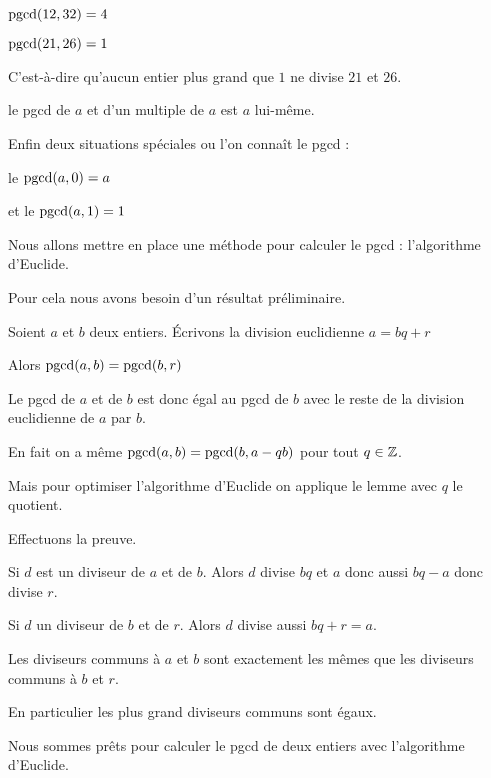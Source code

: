  $\mathop{\mathrm{pgcd}}\nolimits(12,32)=4$ 

\change

 $\mathop{\mathrm{pgcd}}\nolimits(21,26)=1$

C'est-à-dire qu'aucun entier plus grand que $1$ ne divise $21$ et $26$.

\change

le pgcd de $a$ et d'un multiple de $a$ est $a$ lui-même.

\change

Enfin deux situations spéciales ou l'on connaît le pgcd :

le  $\mathop{\mathrm{pgcd}}\nolimits(a,0)=a$ 

\change

et le $\mathop{\mathrm{pgcd}}\nolimits(a,1)=1$


\diapo

Nous allons mettre en place une méthode pour calculer le pgcd : l'algorithme d'Euclide.

Pour cela nous avons besoin d'un résultat préliminaire.

Soient $a$ et $b$ deux entiers. 
\'Ecrivons la division euclidienne $a=bq+r$

Alors $\mathop{\mathrm{pgcd}}\nolimits(a,b)=\mathop{\mathrm{pgcd}}\nolimits(b,r)$

Le pgcd de $a$ et de $b$ est donc égal au pgcd 
de $b$ avec le reste de la division euclidienne de $a$ par $b$.

\change


En fait on a même $\mathop{\mathrm{pgcd}}\nolimits(a,b) = \mathop{\mathrm{pgcd}}\nolimits(b,a-qb)$ pour tout $q\in \mathbb{Z}$.


Mais pour optimiser l'algorithme d'Euclide on applique le lemme avec $q$ le quotient.

\change

Effectuons la preuve.

Si $d$ est un diviseur de $a$ et de $b$. Alors $d$ divise $bq$ et $a$ donc aussi $bq-a$ donc divise $r$.

\change

Si $d$ un diviseur de $b$ et de $r$. Alors $d$ divise aussi $bq+r=a$.

\change

Les diviseurs communs à $a$ et $b$ sont exactement les mêmes que les diviseurs communs à $b$ et $r$.

En particulier les plus grand diviseurs communs sont égaux.



\diapo

Nous sommes prêts pour calculer le pgcd de deux entiers avec l'algorithme d'Euclide.

